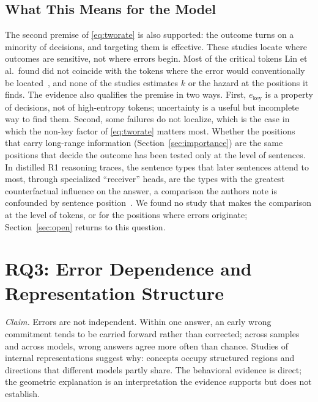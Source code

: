 \documentclass{ieeeaccess}
\begin{document}
\subsection{What This Means for the Model}
The second premise of \eqref{eq:tworate} is also supported: the outcome turns on a minority of decisions, and targeting them is effective. These studies locate where outcomes are sensitive, not where errors begin. Most of the critical tokens Lin et al.\ found did not coincide with the tokens where the error would conventionally be located~\cite{lin2024critical}, and none of the studies estimates $k$ or the hazard at the positions it finds. The evidence also qualifies the premise in two ways. First, $e_{\text{key}}$ is a property of decisions, not of high-entropy tokens; uncertainty is a useful but incomplete way to find them. Second, some failures do not localize, which is the case in which the non-key factor of \eqref{eq:tworate} matters most. Whether the positions that carry long-range information (Section~\ref{sec:importance}) are the same positions that decide the outcome has been tested only at the level of sentences. In distilled R1 reasoning traces, the sentence types that later sentences attend to most, through specialized ``receiver'' heads, are the types with the greatest counterfactual influence on the answer, a comparison the authors note is confounded by sentence position~\cite{bogdan2025anchors}. We found no study that makes the comparison at the level of tokens, or for the positions where errors originate; Section~\ref{sec:open} returns to this question.

\section{RQ3: Error Dependence and Representation Structure}
\label{sec:dependence}

\emph{Claim.} Errors are not independent. Within one answer, an early wrong commitment tends to be carried forward rather than corrected; across samples and across models, wrong answers agree more often than chance. Studies of internal representations suggest why: concepts occupy structured regions and directions that different models partly share. The behavioral evidence is direct; the geometric explanation is an interpretation the evidence supports but does not establish.
\end{document}
